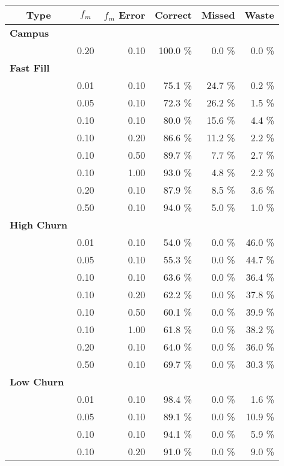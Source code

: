 \begin{table}[t!]
\begin{threeparttable}
{\small
\begin{tabularx}{\columnwidth}{Xrrrrr}
\multicolumn{1}{c}{\textbf{Type}} & 
\multicolumn{1}{c}{\textbf{$f_m$}} & 
\multicolumn{1}{c}{\textbf{$f_m$ Error}} & 
\multicolumn{1}{c}{\textbf{Correct}} & 
\multicolumn{1}{c}{\textbf{Missed}} & 
\multicolumn{1}{c}{\textbf{Waste}}\\ \toprule

\textbf{Campus} & & & & & \\
\midrule
& 0.20 & 0.10 & 100.0 \% & 0.0 \% & 0.0 \% \\
\textbf{Fast Fill} & & & & & \\
\midrule
& 0.01 & 0.10 & 75.1 \% & 24.7 \% & 0.2 \% \\
& 0.05 & 0.10 & 72.3 \% & 26.2 \% & 1.5 \% \\
& 0.10 & 0.10 & 80.0 \% & 15.6 \% & 4.4 \% \\
& 0.10 & 0.20 & 86.6 \% & 11.2 \% & 2.2 \% \\
& 0.10 & 0.50 & 89.7 \% & 7.7 \% & 2.7 \% \\
& 0.10 & 1.00 & 93.0 \% & 4.8 \% & 2.2 \% \\
& 0.20 & 0.10 & 87.9 \% & 8.5 \% & 3.6 \% \\
& 0.50 & 0.10 & 94.0 \% & 5.0 \% & 1.0 \% \\
\textbf{High Churn} & & & & & \\
\midrule
& 0.01 & 0.10 & 54.0 \% & 0.0 \% & 46.0 \% \\
& 0.05 & 0.10 & 55.3 \% & 0.0 \% & 44.7 \% \\
& 0.10 & 0.10 & 63.6 \% & 0.0 \% & 36.4 \% \\
& 0.10 & 0.20 & 62.2 \% & 0.0 \% & 37.8 \% \\
& 0.10 & 0.50 & 60.1 \% & 0.0 \% & 39.9 \% \\
& 0.10 & 1.00 & 61.8 \% & 0.0 \% & 38.2 \% \\
& 0.20 & 0.10 & 64.0 \% & 0.0 \% & 36.0 \% \\
& 0.50 & 0.10 & 69.7 \% & 0.0 \% & 30.3 \% \\
\textbf{Low Churn} & & & & & \\
\midrule
& 0.01 & 0.10 & 98.4 \% & 0.0 \% & 1.6 \% \\
& 0.05 & 0.10 & 89.1 \% & 0.0 \% & 10.9 \% \\
& 0.10 & 0.10 & 94.1 \% & 0.0 \% & 5.9 \% \\
& 0.10 & 0.20 & 91.0 \% & 0.0 \% & 9.0 \% \\

\end{tabularx}}
\end{threeparttable}
\end{table}
